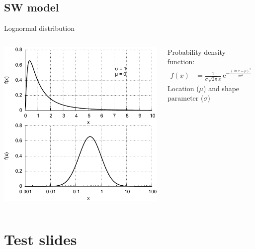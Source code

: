 \subsection{SW model}

\begin{frame}[c,label=lognormal_distribution]{Lognormal distribution}{}
	\begin{columns}[c]
		
	\includegraphics[width=\textwidth]{../figures_of_mine/gnuplots/lognormal_semi_log.pdf}

	
	Probability density function:
	\begin{align}
		f(x) &= \frac{1}{\sigma \sqrt{2 \pi} x} \, \text{e}^{- \frac{(\ln x - \mu)^2}{2 \sigma^2}}	\nonumber
	\end{align}
	Location ($\mu$) and shape parameter ($\sigma$)
	
	\end{columns}
\end{frame}


\section{Test slides}

